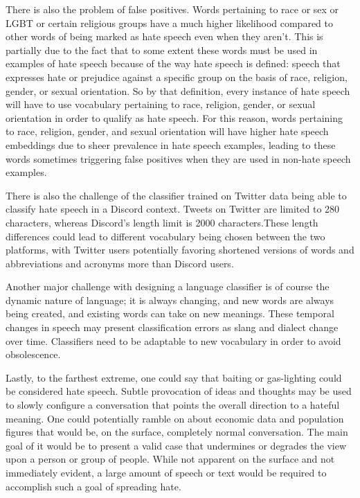 \documentclass[conference]{sig-alternate-05-2015}
\begin{document}
There is also the problem of false positives. Words pertaining to race or sex or LGBT or certain religious groups have a much higher likelihood compared to other words of being marked as hate speech even when they aren't. This is partially due to the fact that to some extent these words must be used in examples of hate speech because of the way hate speech is defined: speech that expresses hate or prejudice against a specific group on the basis of race, religion, gender, or sexual orientation. So by that definition, every instance of hate speech will have to use vocabulary pertaining to race, religion, gender, or sexual orientation in order to qualify as hate speech. For this reason, words pertaining to race, religion, gender, and sexual orientation will have higher hate speech embeddings due to sheer prevalence in hate speech examples, leading to these words sometimes triggering false positives when they are used in non-hate speech examples. 

There is also the challenge of the classifier trained on Twitter data being able to classify hate speech in a Discord context. Tweets on Twitter are limited to 280 characters, whereas Discord's length limit is 2000 characters.These length differences could lead to different vocabulary being chosen between the two platforms, with Twitter users potentially favoring shortened versions of words and abbreviations and acronyms more than Discord users.

Another major challenge with designing a language classifier is of course the dynamic nature of language; it is always changing, and new words are always being created, and existing words can take on new meanings. These temporal changes in speech may present classification errors as slang and dialect change over time. Classifiers need to be adaptable to new vocabulary in order to avoid obsolescence.

Lastly, to the farthest extreme, one could say that baiting or gas-lighting could be considered hate speech.  Subtle provocation of ideas and thoughts may be used to slowly configure a conversation that points the overall direction to a hateful meaning.  One could potentially ramble on about economic data and population figures that would be, on the surface, completely normal conversation.  The main goal of it would be to present a valid case that undermines or degrades the view upon a person or group of people.  While not apparent on the surface and not immediately evident, a large amount of speech or text would be required to accomplish such a goal of spreading hate.
\end{document}
